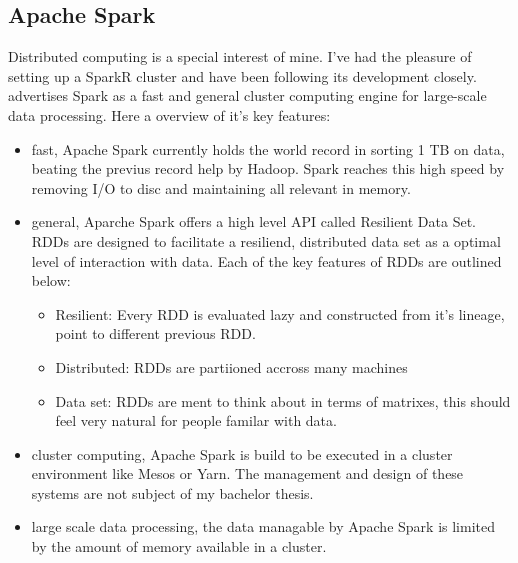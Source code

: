 \documentclass{article}
\begin{document}
    \subsection{Apache Spark}
    Distributed computing is a special interest of mine. I've had the pleasure of setting up a SparkR cluster and have been following its development closely. \cite{spark} advertises Spark as a fast and general cluster computing engine for large-scale data processing. Here a overview of it's key features:
    \begin{itemize}
        \item fast, Apache Spark currently holds the world record in sorting 1 TB on data, beating the previus record help by Hadoop. Spark reaches this high speed by removing I/O to disc and maintaining all relevant in memory.
        \item general, Aparche Spark offers a high level API called Resilient Data Set. RDDs are designed to facilitate a resiliend, distributed data set as a optimal level of interaction with data. Each of the key features of RDDs are outlined below:
        \begin{itemize}
            \item Resilient: Every RDD is evaluated lazy and constructed from it's lineage, point to different previous RDD.
            \item Distributed: RDDs are partiioned accross many machines
            \item Data set: RDDs are ment to think about in terms of matrixes, this should feel very natural for people familar with data.
        \end{itemize}
        \item cluster computing, Apache Spark is build to be executed in a cluster environment like Mesos or Yarn. The management and design of these systems are not subject of my bachelor thesis.
        \item large scale data processing, the data managable by Apache Spark is limited by the amount of memory available in a cluster.

    \end{itemize}
\end{document}
